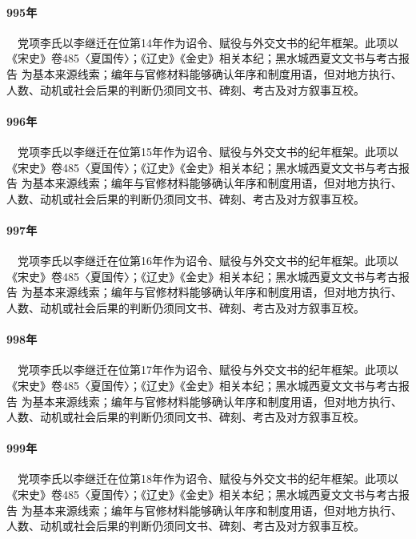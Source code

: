 \paragraph{995年}　党项李氏以李继迁在位第14年作为诏令、赋役与外交文书的纪年框架。此项以《宋史》卷485〈夏国传〉；《辽史》《金史》相关本纪；黑水城西夏文文书与考古报告 为基本来源线索；编年与官修材料能够确认年序和制度用语，但对地方执行、人数、动机或社会后果的判断仍须同文书、碑刻、考古及对方叙事互校。

\paragraph{996年}　党项李氏以李继迁在位第15年作为诏令、赋役与外交文书的纪年框架。此项以《宋史》卷485〈夏国传〉；《辽史》《金史》相关本纪；黑水城西夏文文书与考古报告 为基本来源线索；编年与官修材料能够确认年序和制度用语，但对地方执行、人数、动机或社会后果的判断仍须同文书、碑刻、考古及对方叙事互校。

\paragraph{997年}　党项李氏以李继迁在位第16年作为诏令、赋役与外交文书的纪年框架。此项以《宋史》卷485〈夏国传〉；《辽史》《金史》相关本纪；黑水城西夏文文书与考古报告 为基本来源线索；编年与官修材料能够确认年序和制度用语，但对地方执行、人数、动机或社会后果的判断仍须同文书、碑刻、考古及对方叙事互校。

\paragraph{998年}　党项李氏以李继迁在位第17年作为诏令、赋役与外交文书的纪年框架。此项以《宋史》卷485〈夏国传〉；《辽史》《金史》相关本纪；黑水城西夏文文书与考古报告 为基本来源线索；编年与官修材料能够确认年序和制度用语，但对地方执行、人数、动机或社会后果的判断仍须同文书、碑刻、考古及对方叙事互校。

\paragraph{999年}　党项李氏以李继迁在位第18年作为诏令、赋役与外交文书的纪年框架。此项以《宋史》卷485〈夏国传〉；《辽史》《金史》相关本纪；黑水城西夏文文书与考古报告 为基本来源线索；编年与官修材料能够确认年序和制度用语，但对地方执行、人数、动机或社会后果的判断仍须同文书、碑刻、考古及对方叙事互校。

